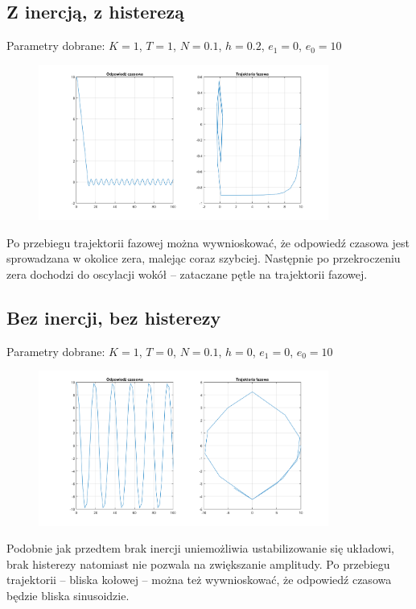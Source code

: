 \documentclass[a4paper, 12pt]{article}
\begin{document}
		\subsection{Z inercją, z histerezą}
			Parametry dobrane: $K = 1$, $T = 1$, $N = 0.1$, $h = 0.2$, $e_1 = 0$, $e_0 = 10$
			\begin{figure}[H]
				\centering
				\includegraphics[width = 0.85\textwidth]{./img/K_1_T_1_N_1_h_2_e1_0_e0_100.png}
			\end{figure} \noindent
			Po przebiegu trajektorii fazowej można wywnioskować, że odpowiedź czasowa jest sprowadzana w okolice zera, malejąc coraz szybciej. Następnie po przekroczeniu zera dochodzi do oscylacji wokół -- zataczane pętle na trajektorii fazowej.
		\subsection{Bez inercji, bez histerezy}
			Parametry dobrane: $K = 1$, $T = 0$, $N = 0.1$, $h = 0$, $e_1 = 0$, $e_0 = 10$
			\begin{figure}[H]
				\centering
				\includegraphics[width = 0.85\textwidth]{./img/K_1_T_0_N_1_h_0_e1_0_e0_100.png}
			\end{figure} \noindent
			Podobnie jak przedtem brak inercji uniemożliwia ustabilizowanie się układowi, brak histerezy natomiast nie pozwala na zwiększanie amplitudy. Po przebiegu trajektorii -- bliska kołowej -- można też wywnioskować, że odpowiedź czasowa będzie bliska sinusoidzie.
\end{document}

